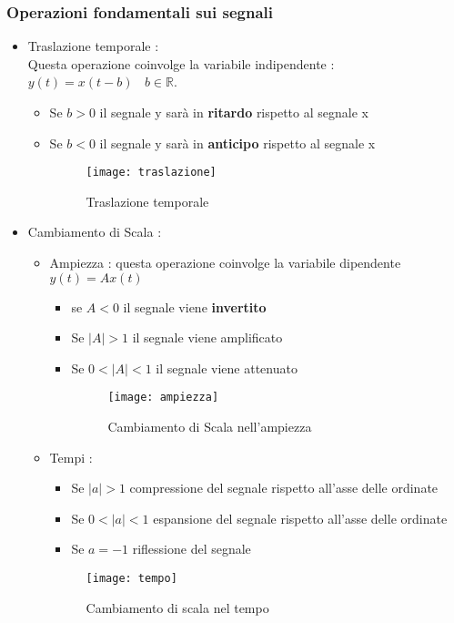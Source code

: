\documentclass{article}
\theoremstyle{definition}
\newcommand{\R}{\mathbb{R}}
\begin{document}
\subsubsection{Operazioni fondamentali sui segnali}
\begin{itemize}
	\item Traslazione temporale  : \\
	Questa operazione coinvolge la variabile indipendente : $y(t)=x(t-b) \ \ \ \ b \in \R$.
	\begin{itemize}
	\item Se $b>0$ il segnale y sarà in \textbf{ritardo} rispetto al segnale x
	\item Se $b<0$ il segnale y sarà in \textbf{anticipo}  rispetto al segnale x 
	\begin{figure}[h]
		\centering
		\texttt{[image: traslazione]}
		\caption{Traslazione temporale}
		\label{fig:traslazione}
	\end{figure}
	\end{itemize}
	\item Cambiamento di Scala \label{ampiezza}: 
	\begin{itemize}
		\item Ampiezza : questa operazione coinvolge la variabile dipendente $y(t)=Ax(t)$ 
		\begin{itemize}
			\item se $A<0$ il segnale viene \textbf{invertito}
			\item Se $|A| > 1$ il segnale viene amplificato
			\item Se $0<|A|<1$ il segnale viene attenuato  
			\begin{figure}[h]
				\centering
				\texttt{[image: ampiezza]}
				\caption{Cambiamento di Scala nell'ampiezza }
				\label{fig:ampiezza}
			\end{figure}
		\end{itemize}
		\item Tempi : 
		\begin{itemize}
			\item Se $|a|>1$ compressione del segnale rispetto all'asse delle ordinate
			\item Se $0<|a|<1$ espansione del segnale rispetto all'asse delle ordinate 
			\item Se $a=-1$ riflessione del segnale 
		\end{itemize}
			\begin{figure}[h]
			\centering
			\texttt{[image: tempo]}
			\caption{ Cambiamento di scala nel tempo}
			\label{fig:tempo}
		\end{figure}
	\end{itemize}
\end{itemize}
\end{document}
